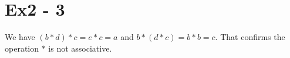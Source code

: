 \section*{Ex2 - 3}
We have $ (b * d) * c = e * c = a $ and $ b * (d * c) = b * b = c $. That confirms the operation $ * $ is not associative.